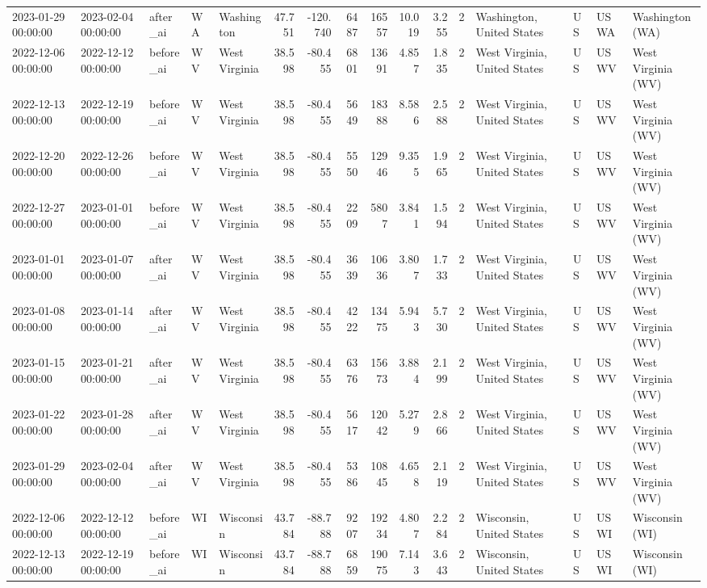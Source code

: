 \begin{tabular}{lllllrrrrrrlllll}
2023-01-29 00:00:00 & 2023-02-04 00:00:00 & after\_ai & WA & Washington & 47.751 & -120.740 & 6487 & 16557 & 10.019 & 3.255 & 2 & Washington, United States & US & USWA & Washington (WA) \\
2022-12-06 00:00:00 & 2022-12-12 00:00:00 & before\_ai & WV & West Virginia & 38.598 & -80.455 & 6801 & 13691 & 4.857 & 1.835 & 2 & West Virginia, United States & US & USWV & West Virginia (WV) \\
2022-12-13 00:00:00 & 2022-12-19 00:00:00 & before\_ai & WV & West Virginia & 38.598 & -80.455 & 5649 & 18388 & 8.586 & 2.588 & 2 & West Virginia, United States & US & USWV & West Virginia (WV) \\
2022-12-20 00:00:00 & 2022-12-26 00:00:00 & before\_ai & WV & West Virginia & 38.598 & -80.455 & 5550 & 12946 & 9.355 & 1.965 & 2 & West Virginia, United States & US & USWV & West Virginia (WV) \\
2022-12-27 00:00:00 & 2023-01-01 00:00:00 & before\_ai & WV & West Virginia & 38.598 & -80.455 & 2209 & 5807 & 3.841 & 1.594 & 2 & West Virginia, United States & US & USWV & West Virginia (WV) \\
2023-01-01 00:00:00 & 2023-01-07 00:00:00 & after\_ai & WV & West Virginia & 38.598 & -80.455 & 3639 & 10636 & 3.807 & 1.733 & 2 & West Virginia, United States & US & USWV & West Virginia (WV) \\
2023-01-08 00:00:00 & 2023-01-14 00:00:00 & after\_ai & WV & West Virginia & 38.598 & -80.455 & 4222 & 13475 & 5.943 & 5.730 & 2 & West Virginia, United States & US & USWV & West Virginia (WV) \\
2023-01-15 00:00:00 & 2023-01-21 00:00:00 & after\_ai & WV & West Virginia & 38.598 & -80.455 & 6376 & 15673 & 3.884 & 2.199 & 2 & West Virginia, United States & US & USWV & West Virginia (WV) \\
2023-01-22 00:00:00 & 2023-01-28 00:00:00 & after\_ai & WV & West Virginia & 38.598 & -80.455 & 5617 & 12042 & 5.279 & 2.866 & 2 & West Virginia, United States & US & USWV & West Virginia (WV) \\
2023-01-29 00:00:00 & 2023-02-04 00:00:00 & after\_ai & WV & West Virginia & 38.598 & -80.455 & 5386 & 10845 & 4.658 & 2.119 & 2 & West Virginia, United States & US & USWV & West Virginia (WV) \\
2022-12-06 00:00:00 & 2022-12-12 00:00:00 & before\_ai & WI & Wisconsin & 43.784 & -88.788 & 9207 & 19234 & 4.807 & 2.284 & 2 & Wisconsin, United States & US & USWI & Wisconsin (WI) \\
2022-12-13 00:00:00 & 2022-12-19 00:00:00 & before\_ai & WI & Wisconsin & 43.784 & -88.788 & 6859 & 19075 & 7.143 & 3.643 & 2 & Wisconsin, United States & US & USWI & Wisconsin (WI) \\

\end{tabular}
